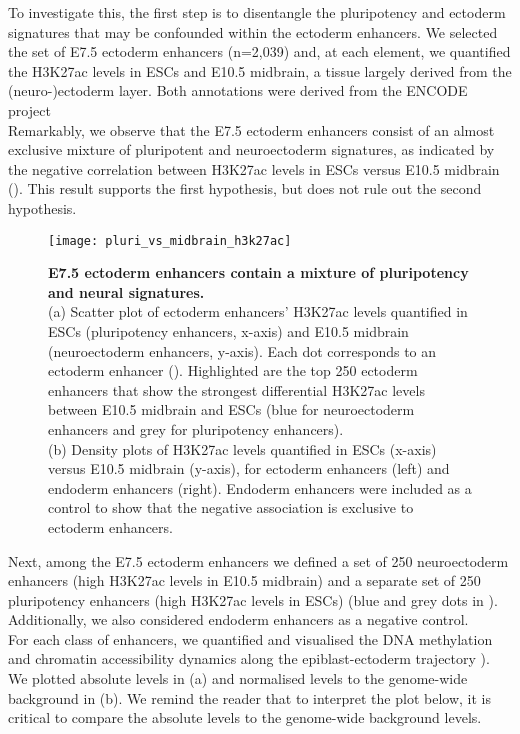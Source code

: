 To investigate this, the first step is to disentangle the pluripotency and ectoderm signatures that may be confounded within the ectoderm enhancers. We selected the set of E7.5 ectoderm enhancers (n=2,039) and, at each element, we quantified the H3K27ac levels in ESCs and E10.5 midbrain, a tissue largely derived from the (neuro-)ectoderm layer. Both annotations were derived from the ENCODE project\cite{Yue2014}\\
Remarkably, we observe that the E7.5 ectoderm enhancers consist of an almost exclusive mixture of pluripotent and neuroectoderm signatures, as indicated by the negative correlation between H3K27ac levels in ESCs versus E10.5 midbrain (). This result supports the first hypothesis, but does not rule out the second hypothesis.

\begin{figure}[H]
	\centering
	\texttt{[image: pluri\_vs\_midbrain\_h3k27ac]}
	\caption[]{
	\textbf{E7.5 ectoderm enhancers contain a mixture of pluripotency and neural signatures.}\\
	(a) Scatter plot of ectoderm enhancers' H3K27ac levels quantified in ESCs (pluripotency enhancers, x-axis) and E10.5 midbrain (neuroectoderm enhancers, y-axis). Each dot corresponds to an ectoderm enhancer (). Highlighted are the top 250 ectoderm enhancers that show the strongest differential H3K27ac levels between E10.5 midbrain and ESCs (blue for neuroectoderm enhancers and grey for pluripotency enhancers). \\
	(b)	Density plots of H3K27ac levels quantified in ESCs (x-axis) versus E10.5 midbrain (y-axis), for ectoderm enhancers (left) and endoderm enhancers (right). Endoderm enhancers were included as a control to show that the negative association is exclusive to ectoderm enhancers.
	}
	\label{fig:pluri_vs_midbrain_h3k27ac}
\end{figure}

Next, among the E7.5 ectoderm enhancers we defined a set of 250 neuroectoderm enhancers (high H3K27ac levels in E10.5 midbrain) and a separate set of 250 pluripotency enhancers (high H3K27ac levels in ESCs) (blue and grey dots in ). Additionally, we also considered endoderm enhancers as a negative control.\\
For each class of enhancers, we quantified and visualised the DNA methylation and chromatin accessibility dynamics along the epiblast-ectoderm trajectory ). We plotted absolute levels in (a) and normalised levels to the genome-wide background in (b). We remind the reader that to interpret the plot below, it is critical to compare the absolute levels to the genome-wide background levels.

